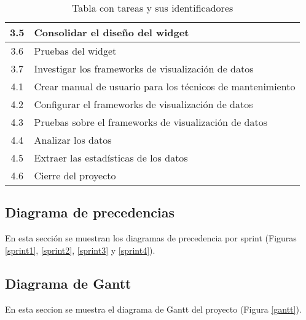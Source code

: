 \begin{table}[]
\begin{tabular}{|c|l|}
		3.5    & Consolidar el diseño del widget                                   \\ \hline
		3.6    & Pruebas del widget                                                \\ \hline
		3.7    & Investigar los frameworks de visualización de datos               \\ \hline
		4.1    & Crear manual de usuario para los técnicos de mantenimiento        \\ \hline
		4.2    & Configurar el frameworks de visualización de datos                \\ \hline
		4.3    & Pruebas sobre el frameworks de visualización de datos             \\ \hline
		4.4    & Analizar los datos                                                \\ \hline
		4.5    & Extraer las estadísticas de los datos                             \\ \hline
		4.6    & Cierre del proyecto                                               \\ \hline
	\end{tabular}
		\caption{Tabla con tareas y sus identificadores}
		\label{tbtareas}
\end{table}


\subsection{Diagrama de precedencias}
En esta sección se muestran los diagramas de precedencia por sprint (Figuras \ref{sprint1}, \ref{sprint2}, \ref{sprint3} y \ref{sprint4}).



\subsection{Diagrama de Gantt}
En esta seccion se muestra el diagrama de Gantt del proyecto (Figura \ref{gantt}).


